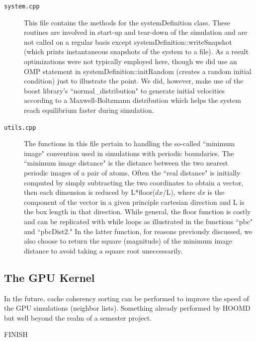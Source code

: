 \documentclass[12pt]{article}
\begin{document}
\begin{description}
\item[\texttt{system.cpp}] 
This file contains the methods for the systemDefinition class.  These routines are involved in start-up and tear-down of the simulation and are not called on a regular basis except systemDefinition::writeSnapshot (which prints instantaneous snapshots of the system to a file).  As a result optimizations were not typically employed here, though we did use an OMP statement in systemDefinition::initRandom (creates a random initial condition) just to illustrate the point.  We did, however, make use of the boost library's ``normal\_distribution" to generate initial velocities according to a Maxwell-Boltzmann distribution which helps the system reach equilibrium faster during simulation.

\item[\texttt{utils.cpp}] 
The functions in this file pertain to handling the so-called ``minimum image" convention used in simulations with periodic boundaries.  The ``minimum image distance" is the distance between the two nearest periodic images of a pair of atoms.  Often the ``real distance" is initially computed by simply subtracting the two coordinates to obtain a vector, then each dimension is reduced by L*floor($dx$/L), where $dx$ is the component of the vector in a given principle cartesian direction and L is the box length in that direction.  While general, the floor function is costly and can be replicated with while loops as illustrated in the functions ``pbc" and ``pbcDist2."  In the latter function, for reasons previously discussed, we also choose to return the square (magnitude) of the minimum image distance to avoid taking a square root uneccessarily.

\end{description}

\subsection{The GPU Kernel}
\label{sec:gpukernel}

In the future, cache coherency sorting can be performed to improve the speed of the GPU simulations (neighbor lists).  Something already performed by HOOMD but well beyond the realm of a semester project.


FINISH



\end{document}
